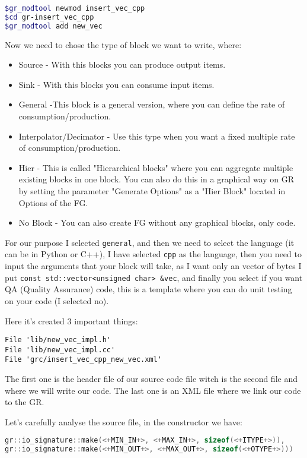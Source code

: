 \documentclass[a4paper, 10pt, conference]{ieeeconf}      %
\begin{document}
\begin{lstlisting}[language=bash, breaklines]
$gr_modtool newmod insert_vec_cpp
$cd gr-insert_vec_cpp
$gr_modtool add new_vec
\end{lstlisting}

    Now we need to chose the type of block we want to write, where:
    \begin{itemize}
        \item Source - With this blocks you can produce output items.
        \item Sink - With this blocks you can consume input items.
        \item General -This block is a general version, where you can define the rate of consumption/production. 
        \item Interpolator/Decimator - Use this type when you want a fixed multiple rate of consumption/production.
        \item Hier - This is called "Hierarchical blocks" where you can aggregate multiple existing blocks in one block. You can also do this in a graphical way on GR by setting the parameter "Generate Options" as a "Hier Block" located in Options of the FG.
        \item No Block - You can also create FG without any graphical blocks, only code.
    \end{itemize}
    
    For our purpose I selected \verb|general|, and then we need to select the language (it can be in Python or C++), I have selected \verb|cpp| as the language, then you need to input the arguments that your block will take, as I want only an vector of bytes I put \verb|const std::vector<unsigned char> &vec|, and  finally you select if you want QA (Quality Assurance) code, this is a template where you can do unit testing on your code (I selected no).
    
    Here it's created 3 important things:
\begin{verbatim}
File 'lib/new_vec_impl.h'
File 'lib/new_vec_impl.cc'
File 'grc/insert_vec_cpp_new_vec.xml'
\end{verbatim}

    The first one is the header file of our source code file witch is the second file and where we will write our code. The last one is an XML file where we link our code to the GR.
    
    Let's carefully analyse the source file, in the constructor we have:
\begin{lstlisting}[language=c++, breaklines]
gr::io_signature::make(<+MIN_IN+>, <+MAX_IN+>, sizeof(<+ITYPE+>)),
gr::io_signature::make(<+MIN_OUT+>, <+MAX_OUT+>, sizeof(<+OTYPE+>)))
\end{lstlisting}
\end{document}
